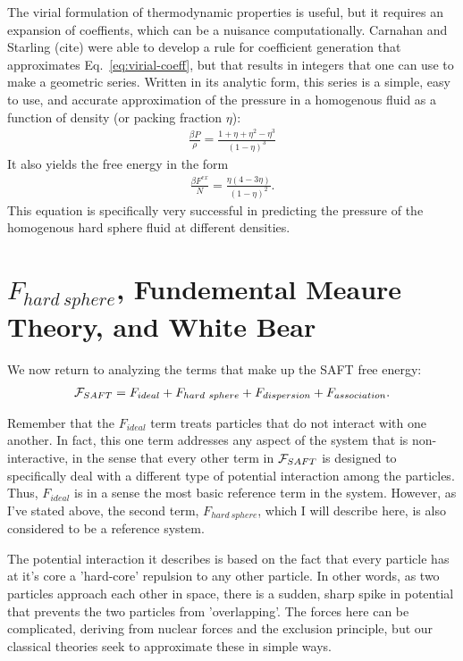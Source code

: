 The virial formulation of thermodynamic properties is useful, but it
requires an expansion of coeffients, which can be a nuisance
computationally.  Carnahan and Starling (cite) were able to develop a
rule for coefficient generation that approximates
Eq.~\ref{eq:virial-coeff}, but that results in integers that one can
use to make a geometric series.  Written in its analytic form, this
series is a simple, easy to use, and accurate approximation of the
pressure in a homogenous fluid as a function of density (or packing
fraction $\eta$):
\begin{align}
  \frac{\beta P}{\rho}=\frac{1+\eta+\eta^2-\eta^3}{(1-\eta)^3}
\end{align}
It also yields the free energy in the form
\begin{align}
  \frac{\beta F^{ex}}{N}=\frac{\eta(4-3\eta)}{(1-\eta)^2}.
\end{align}
This equation is specifically very successful in predicting the
pressure of the homogenous hard sphere fluid at different densities.



\section{$F_{hard~sphere}$, Fundemental Meaure Theory, and White Bear}


We now return to analyzing the terms that make up the SAFT free energy:
\begin{align}
  \mathcal{F}_{SAFT} = F_{ideal} + F_{hard~sphere} +  F_{dispersion} + F_{association}.
\end{align}

Remember that the $F_{ideal}$ term treats particles that do not
interact with one another.  In fact,
this one term addresses any aspect of the system that is
non-interactive, in the sense that every other term in $\mathcal{F}_{SAFT}$ is
designed to specifically deal with a different type of potential
interaction among the particles.  Thus, $F_{ideal}$ is in a sense the
most basic reference term in the system.  However, as I've stated
above, the second term, $F_{hard~sphere}$, which I will describe here,
is also considered to be a reference system.

The potential interaction it describes is based on the fact that every
particle has at it's core a 'hard-core' repulsion to any other
particle.  In other words, as two particles approach each other in
space, there is a sudden, sharp spike in potential that prevents the
two particles from 'overlapping'.  The forces here can be complicated,
deriving from nuclear forces and the exclusion principle, but our
classical theories seek to approximate these in simple ways.

